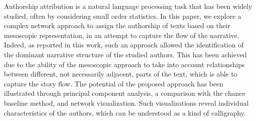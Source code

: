 Authorship attribution is a natural language processing task that has been widely studied, often by considering small order statistics. In this paper, we explore a complex network approach to assign the authorship of texts based on their mesoscopic representation, in an attempt to capture the flow of the narrative.  Indeed, as reported in this work, such an approach allowed the identification of the dominant narrative structure of the studied authors. This has been achieved due to the ability of the mesoscopic approach to take into account relationships between different, not necessarily adjacent, parts of the text, which is able to capture the story flow. The potential of the proposed approach has been illustrated through principal component analysis, a comparison with the chance baseline method, and network visualization. Such visualizations reveal individual characteristics of the authors, which can be understood as a kind of calligraphy.
